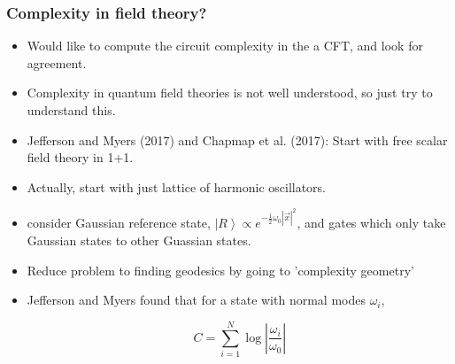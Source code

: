 \documentclass[10pt,aspectratio=169]{beamer}
\newcommand{\ket}[1]{\left| #1 \right>}
\begin{document}
\begin{frame}
\frametitle{Complexity in field theory?}

\begin{itemize}

\item Would like to compute the circuit complexity in the a CFT, and look for agreement.

\item Complexity in quantum field theories is not well understood, so just try to understand this.

\item Jefferson and Myers (2017) and Chapmap et al. (2017): Start with free scalar field theory in 1+1.

\item Actually, start with just lattice of harmonic oscillators.

\item consider Gaussian reference state, $\ket{R} \propto e^{-\frac{1}{2} \omega_0 |\vec{x}|^2}$, and gates which only take Gaussian states to other Guassian states. 

\item Reduce problem to finding geodesics by going to 'complexity geometry'

\item Jefferson and Myers found that for a state with normal modes $\omega_i$, 

$$ C = \sum_{i=1}^N \log\left| \frac{\omega_i}{\omega_0}\right|$$ 

\end{itemize}

\end{frame}
\end{document}
